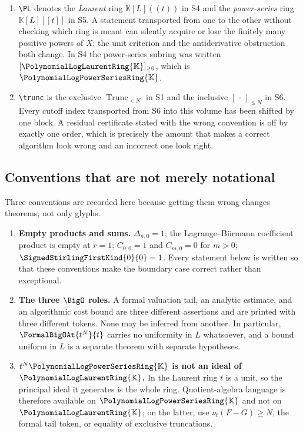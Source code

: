 \documentclass[11pt,oneside]{article}
\theoremstyle{plain}
\theoremstyle{definition}
\theoremstyle{remark}
\newcommand{\K}{\mathbb{K}}
\newcommand{\PLpow}{\PolynomialLogPowerSeriesRing{\K}}   %
\newcommand{\PLlau}{\PolynomialLogLaurentRing{\K}}       %
\newcommand{\ordt}{\nu_{t}}                              %
\newcommand{\shiftop}[2]{\Delta_{#1,#2}}                 %
\newcommand{\stirlingsigned}[2]{\SignedStirlingFirstKind{#1}{#2}}
\begin{document}
\begin{warningbox}[title={Two abbreviations that collide across sources}]
\label{plt:rmk:concordance-collisions}
\begin{enumerate}
\item \verb|\PL| denotes the \emph{Laurent} ring \(\K[L]((t))\) in S4 and the
  \emph{power-series} ring \(\K[L][[t]]\) in S5.  A statement transported from
  one to the other without checking which ring is meant can silently acquire or
  lose the finitely many positive powers of \(X\); the unit criterion and the
  antiderivative obstruction both change.  In S4 the power-series subring was
  written \([\PLlau]_{\ge0}\), which is \(\PLpow\).
\item \verb|\trunc| is the exclusive \(\operatorname{Trunc}_{<N}\) in S1 and the
  inclusive \([\,\cdot\,]_{\le N}\) in S6.  Every cutoff index transported from
  S6 into this volume has been shifted by one block.  A residual certificate
  stated with the wrong convention is off by exactly one order, which is
  precisely the amount that makes a correct algorithm look wrong and an
  incorrect one look right.
\end{enumerate}
\end{warningbox}

\subsection{Conventions that are not merely notational}

Three conventions are recorded here because getting them wrong changes
theorems, not only glyphs.

\begin{enumerate}
\item \textbf{Empty products and sums.}  \(\shiftop{n}{0}=1\); the
  Lagrange--B\"urmann coefficient product is empty at \(r=1\); \(C_{0,0}=1\)
  and \(C_{m,0}=0\) for \(m>0\); \(\stirlingsigned{0}{0}=1\).  Every statement
  below is written so that these conventions make the boundary case correct
  rather than exceptional.
\item \textbf{The three \(\BigO\) roles.}  A formal valuation tail, an analytic
  estimate, and an algorithmic cost bound are three different assertions and
  are printed with three different tokens.  None may be inferred from another.
  In particular, \(\FormalBigOAt{t^{N}}{t}\) carries no uniformity in \(L\)
  whatsoever, and a bound uniform in \(L\) is a separate theorem with separate
  hypotheses.
\item \textbf{\(t^{N}\PLpow\) is not an ideal of \(\PLlau\).}  In the Laurent
  ring \(t\) is a unit, so the principal ideal it generates is the whole ring.
  Quotient-algebra language is therefore available on \(\PLpow\) and not on
  \(\PLlau\); on the latter, use \(\ordt(F-G)\ge N\), the formal tail token, or
  equality of exclusive truncations.
\end{enumerate}
\end{document}
